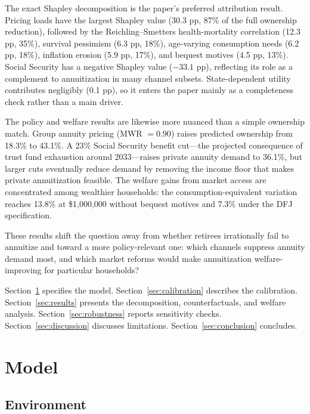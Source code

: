 \documentclass[12pt]{article}
\begin{document}
The exact Shapley decomposition is the paper's preferred attribution result. Pricing loads have the largest Shapley value (30.3 pp, 87\% of the full ownership reduction), followed by the Reichling--Smetters health-mortality correlation (12.3 pp, 35\%), survival pessimism (6.3 pp, 18\%), age-varying consumption needs (6.2 pp, 18\%), inflation erosion (5.9 pp, 17\%), and bequest motives (4.5 pp, 13\%). Social Security has a negative Shapley value ($-33.1$ pp), reflecting its role as a complement to annuitization in many channel subsets. State-dependent utility contributes negligibly (0.1 pp), so it enters the paper mainly as a completeness check rather than a main driver.

The policy and welfare results are likewise more nuanced than a simple ownership match. Group annuity pricing (MWR $= 0.90$) raises predicted ownership from 18.3\% to 43.1\%. A 23\% Social Security benefit cut---the projected consequence of trust fund exhaustion around 2033---raises private annuity demand to 36.1\%, but larger cuts eventually reduce demand by removing the income floor that makes private annuitization feasible. The welfare gains from market access are concentrated among wealthier households: the consumption-equivalent variation reaches 13.8\% at \$1,000,000 without bequest motives and 7.3\% under the DFJ specification.

These results shift the question away from whether retirees irrationally fail to annuitize and toward a more policy-relevant one: which channels suppress annuity demand most, and which market reforms would make annuitization welfare-improving for particular households?

Section~\ref{sec:model} specifies the model. Section~\ref{sec:calibration} describes the calibration. Section~\ref{sec:results} presents the decomposition, counterfactuals, and welfare analysis. Section~\ref{sec:robustness} reports sensitivity checks. Section~\ref{sec:discussion} discusses limitations. Section~\ref{sec:conclusion} concludes.


\section{Model}
\label{sec:model}

\subsection{Environment}
\end{document}
